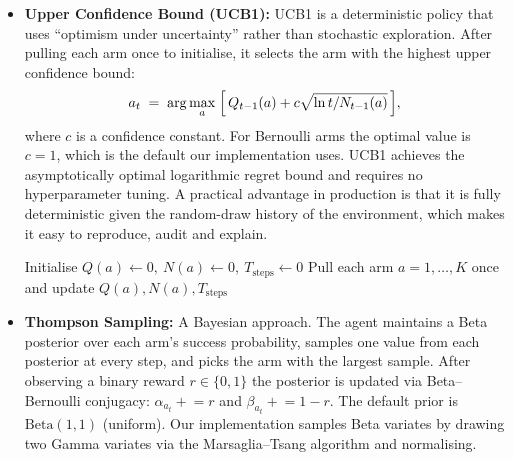 \begin{itemize}
\item \textbf{Upper Confidence Bound (UCB1):}
UCB1 is a deterministic policy that uses ``optimism under uncertainty'' rather than stochastic exploration. After pulling each arm once to initialise, it selects the arm with the highest upper confidence bound:
\begin{equation}
a_t \;=\; \arg\max_a \;\Bigl[\, Q_{t-1}(a) + c\sqrt{\ln t / N_{t-1}(a)} \,\Bigr],
\label{eq:ucb}
\end{equation}
where $c$ is a confidence constant. For Bernoulli arms the optimal value is $c = 1$, which is the default our implementation uses. UCB1 achieves the asymptotically optimal logarithmic regret bound and requires no hyperparameter tuning. A practical advantage in production is that it is fully deterministic given the random-draw history of the environment, which makes it easy to reproduce, audit and explain.
\begin{algorithm}[H]
Initialise $Q(a)\leftarrow 0,\ N(a)\leftarrow 0,\ T_{\text{steps}}\leftarrow 0$\;
Pull each arm $a=1,\ldots,K$ once and update $Q(a),N(a),T_{\text{steps}}$\;
\caption{UCB1}
\end{algorithm}

\item \textbf{Thompson Sampling:}
A Bayesian approach. The agent maintains a Beta posterior over each arm's success probability, samples one value from each posterior at every step, and picks the arm with the largest sample. After observing a binary reward $r \in \{0,1\}$ the posterior is updated via Beta--Bernoulli conjugacy: $\alpha_{a_t} \mathrel{+}= r$ and $\beta_{a_t} \mathrel{+}= 1-r$. The default prior is $\mathrm{Beta}(1, 1)$ (uniform). Our implementation samples Beta variates by drawing two Gamma variates via the Marsaglia--Tsang algorithm and normalising.
\begin{algorithm}[H]
\caption{Thompson Sampling (Beta--Bernoulli)}
\end{algorithm}


\end{itemize}
